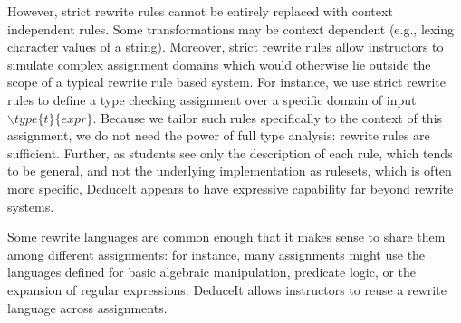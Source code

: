 \documentclass{sigchi}
\newcommand{\msb}[1]{\textbf{\textcolor{cyan}{Michael: #1}}}
\begin{document}
However, strict rewrite rules cannot be entirely replaced with context independent rules. Some transformations may be context dependent (e.g., lexing character values of a string). Moreover, strict rewrite rules allow instructors to simulate complex assignment domains which would otherwise lie outside the scope of a typical rewrite rule based system. For instance, we use strict rewrite rules to define a type checking assignment over a specific domain of input $\backslash{}type\{t\}\{expr\}$. Because we tailor such rules specifically to the context of this assignment, we do not need the power of full type analysis: rewrite rules are sufficient. Further, as students see only the description of each rule, which tends to be general, and not the underlying implementation as rulesets, which is often more specific, DeduceIt appears to have expressive capability far beyond rewrite systems.  %


Some rewrite languages are common enough that it makes sense to share them among different assignments: for instance, many assignments might use the languages defined for basic algebraic manipulation, predicate logic, or the expansion of regular expressions. DeduceIt allows instructors to reuse a rewrite language across assignments.


\end{document}
